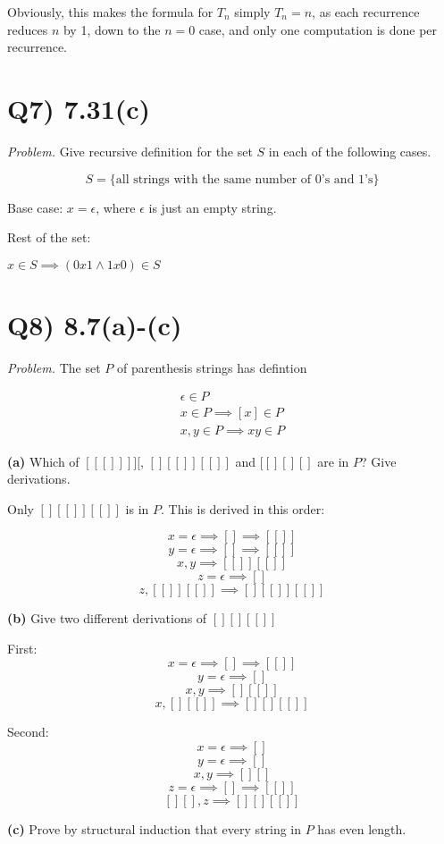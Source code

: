 \documentclass{article}
\begin{document}
Obviously, this makes the formula for $T_n$ simply $T_n = n$, as each recurrence reduces $n$ by 1, down to the $n = 0$ case, and only one computation is done per recurrence. 


\section*{Q7) 7.31(c)}
\textit{Problem.} Give recursive definition for the set $S$ in each of the following cases.

$$S = \{\text{all strings with the same number of 0's and 1's}\}$$

Base case: $x = \epsilon$, where $\epsilon$ is just an empty string.

Rest of the set: 

$x \in S \implies (0x1 \wedge 1x0) \in S$

\section*{Q8) 8.7(a)-(c)}
\textit{Problem.} The set $P$ of parenthesis strings has defintion

\begin{align*}
  \epsilon \in P \\
  x \in P \implies [x] \in P \\
  x,y \in P \implies xy \in P
\end{align*}

\noindent\textbf{(a)} Which of $[[[ ]]]][$, $[ ][[ ]][[ ]]$ and $[[ ][ ][ ]$ are in $P$? Give derivations.


Only $[ ][[ ]][[ ]]$ is in $P$. This is derived in this order:

$$x = \epsilon \implies [] \implies [[]]$$ 
$$y = \epsilon \implies [] \implies [[]]$$
$$x,y \implies [[]][[]]$$
$$z = \epsilon \implies []$$
$$z, [[]][[]] \implies [][[]][[]]$$

\noindent\textbf{(b)} Give two different derivations of $[ ][ ][[ ]]$

\noindent First:
$$x = \epsilon \implies [] \implies [[]]$$
$$y = \epsilon \implies []$$
$$x,y \implies [][[]]$$
$$x, [][[]] \implies [][][[]]$$

\noindent Second:
$$x = \epsilon \implies []$$
$$y = \epsilon \implies []$$
$$x,y \implies [][]$$
$$z = \epsilon \implies [] \implies [[]]$$
$$[][], z \implies [][][[]]$$


\noindent\textbf{(c)} Prove by structural induction that every string in $P$ has even length.
\end{document}
